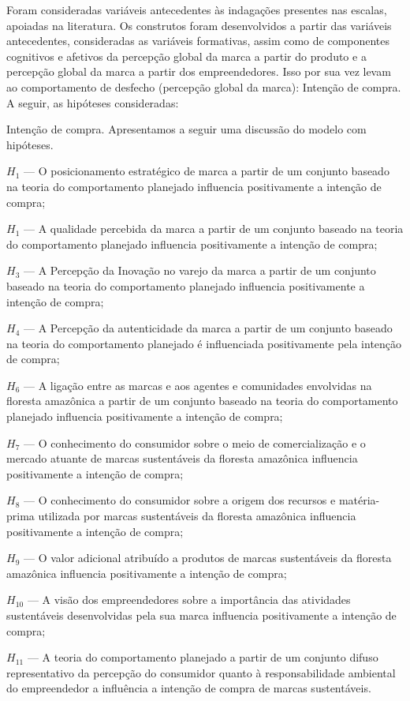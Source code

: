 Foram consideradas variáveis antecedentes às indagações presentes nas escalas, apoiadas na literatura. Os construtos foram desenvolvidos a partir das variáveis antecedentes, consideradas as variáveis formativas, assim como de componentes cognitivos e afetivos da percepção global da marca a partir do produto e a percepção global da marca a partir dos empreendedores. Isso por sua vez levam ao comportamento de desfecho (percepção global da marca): Intenção de compra. A seguir, as hipóteses consideradas:

Intenção de compra. Apresentamos a seguir uma discussão do modelo com hipóteses.

$H_1$ — O posicionamento estratégico de marca a partir de um conjunto baseado na teoria do comportamento planejado influencia positivamente a intenção de compra;

$H_1$ — A qualidade percebida da marca a partir de um conjunto baseado na teoria do comportamento planejado influencia positivamente a intenção de compra;

$H_3$ — A Percepção da Inovação no varejo da marca a partir de um conjunto baseado na teoria do comportamento planejado influencia positivamente a intenção de compra;

$H_4$ — A Percepção da autenticidade da marca a partir de um conjunto baseado na teoria do comportamento planejado é influenciada positivamente pela intenção de compra;

$H_6$ — A ligação entre as marcas e aos agentes e comunidades envolvidas na floresta amazônica a partir de um conjunto baseado na teoria do comportamento planejado influencia positivamente a intenção de compra;

$H_7$ — O conhecimento do consumidor sobre o meio de comercialização e o mercado atuante de marcas sustentáveis da floresta amazônica influencia positivamente a intenção de compra;

$H_8$ — O conhecimento do consumidor sobre a origem dos recursos e matéria-prima utilizada por marcas sustentáveis da floresta amazônica influencia positivamente a intenção de compra;

$H_9$ — O valor adicional atribuído a produtos de marcas sustentáveis da floresta amazônica influencia positivamente a intenção de compra;

$H_{10}$ — A visão dos empreendedores sobre a importância das atividades sustentáveis desenvolvidas pela sua marca influencia positivamente a intenção de compra;

$H_{11}$ — A teoria do comportamento planejado a partir de um conjunto difuso representativo da percepção do consumidor quanto à responsabilidade ambiental do empreendedor a influência a intenção de compra de marcas sustentáveis.

